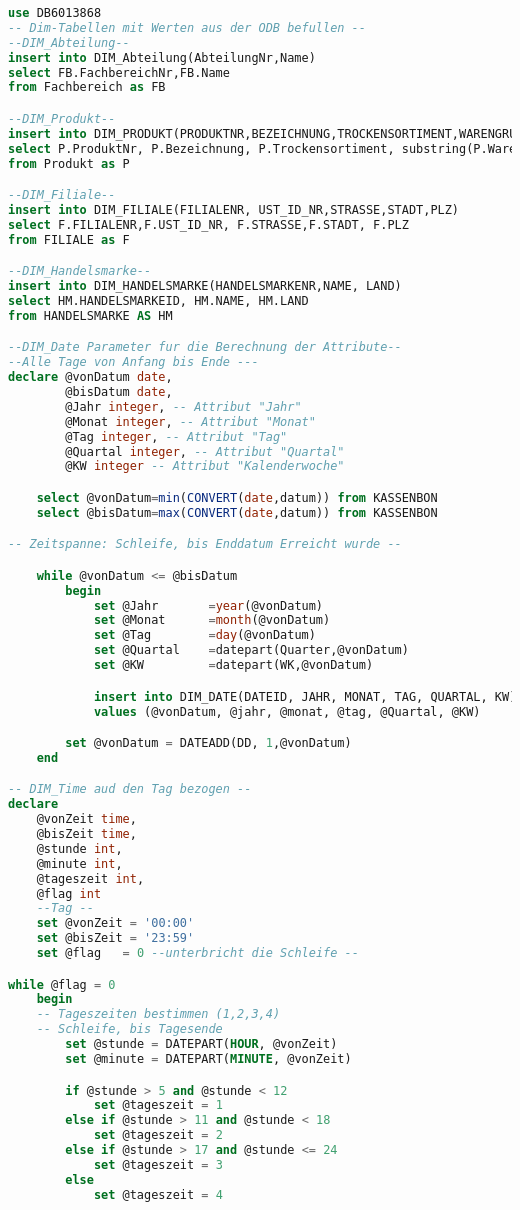 \begin{lstlisting}[language=SQL]
use DB6013868
-- Dim-Tabellen mit Werten aus der ODB befullen --
--DIM_Abteilung--
insert into DIM_Abteilung(AbteilungNr,Name)
select FB.FachbereichNr,FB.Name
from Fachbereich as FB

--DIM_Produkt--
insert into DIM_PRODUKT(PRODUKTNR,BEZEICHNUNG,TROCKENSORTIMENT,WARENGRUPPE)
select P.ProduktNr, P.Bezeichnung, P.Trockensortiment, substring(P.Warengruppe,3,1)
from Produkt as P

--DIM_Filiale--
insert into DIM_FILIALE(FILIALENR, UST_ID_NR,STRASSE,STADT,PLZ)
select F.FILIALENR,F.UST_ID_NR, F.STRASSE,F.STADT, F.PLZ
from FILIALE as F

--DIM_Handelsmarke--
insert into DIM_HANDELSMARKE(HANDELSMARKENR,NAME, LAND)
select HM.HANDELSMARKEID, HM.NAME, HM.LAND
from HANDELSMARKE AS HM

--DIM_Date Parameter fur die Berechnung der Attribute--
--Alle Tage von Anfang bis Ende ---
declare @vonDatum date,
		@bisDatum date,
		@Jahr integer, -- Attribut "Jahr"
		@Monat integer, -- Attribut "Monat"
		@Tag integer, -- Attribut "Tag"
		@Quartal integer, -- Attribut "Quartal"
		@KW integer -- Attribut "Kalenderwoche"

	select @vonDatum=min(CONVERT(date,datum)) from KASSENBON
	select @bisDatum=max(CONVERT(date,datum)) from KASSENBON

-- Zeitspanne: Schleife, bis Enddatum Erreicht wurde --

	while @vonDatum <= @bisDatum
		begin
			set @Jahr		=year(@vonDatum)
			set @Monat		=month(@vonDatum)
			set @Tag		=day(@vonDatum)
			set @Quartal	=datepart(Quarter,@vonDatum)
			set @KW			=datepart(WK,@vonDatum)

			insert into DIM_DATE(DATEID, JAHR, MONAT, TAG, QUARTAL, KW)
			values (@vonDatum, @jahr, @monat, @tag, @Quartal, @KW)

		set @vonDatum = DATEADD(DD, 1,@vonDatum)
	end

-- DIM_Time aud den Tag bezogen --
declare
	@vonZeit time,
	@bisZeit time,
	@stunde int,
	@minute int,
	@tageszeit int,
	@flag int
    --Tag --
	set @vonZeit = '00:00'
	set @bisZeit = '23:59'
	set @flag	= 0 --unterbricht die Schleife --

while @flag = 0
	begin
    -- Tageszeiten bestimmen (1,2,3,4)
    -- Schleife, bis Tagesende
		set @stunde = DATEPART(HOUR, @vonZeit)
		set @minute = DATEPART(MINUTE, @vonZeit)

		if @stunde > 5 and @stunde < 12
			set @tageszeit = 1
		else if @stunde > 11 and @stunde < 18
			set @tageszeit = 2
		else if @stunde > 17 and @stunde <= 24
			set @tageszeit = 3
		else
			set @tageszeit = 4


\end{lstlisting}
